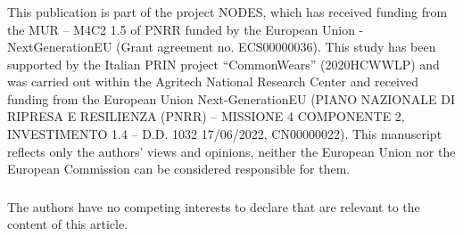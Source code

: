 \documentclass[runningheads]{llncs}
\begin{document}
\begin{credits}
\subsubsection{\ackname}
This publication is part of the project NODES, which has received funding from the MUR – M4C2 1.5 of PNRR funded by the European Union - NextGenerationEU (Grant agreement no. ECS00000036). This  study has been supported by the Italian PRIN project ``CommonWears'' (2020HCWWLP) and was carried out within the Agritech National Research Center and received funding from the European Union Next-GenerationEU (PIANO NAZIONALE DI RIPRESA E RESILIENZA (PNRR) – MISSIONE 4 COMPONENTE 2, INVESTIMENTO 1.4 – D.D. 1032 17/06/2022, CN00000022). This manuscript reflects only the authors’ views and opinions, neither the European Union nor the European Commission can be considered responsible for them.

\subsubsection{\discintname}
The authors have no competing interests to declare that are relevant to the content of this article.
\end{credits}



\end{document}
